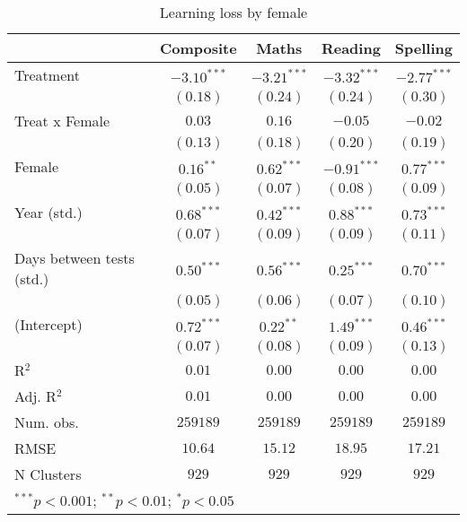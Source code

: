 
\begin{table}
\begin{center}
\begin{tabular}{l c c c c}
\hline
 & Composite & Maths & Reading & Spelling \\
\hline
Treatment                 & $-3.10^{***}$ & $-3.21^{***}$ & $-3.32^{***}$ & $-2.77^{***}$ \\
                          & $(0.18)$      & $(0.24)$      & $(0.24)$      & $(0.30)$      \\
Treat x Female            & $0.03$        & $0.16$        & $-0.05$       & $-0.02$       \\
                          & $(0.13)$      & $(0.18)$      & $(0.20)$      & $(0.19)$      \\
Female                    & $0.16^{**}$   & $0.62^{***}$  & $-0.91^{***}$ & $0.77^{***}$  \\
                          & $(0.05)$      & $(0.07)$      & $(0.08)$      & $(0.09)$      \\
Year (std.)               & $0.68^{***}$  & $0.42^{***}$  & $0.88^{***}$  & $0.73^{***}$  \\
                          & $(0.07)$      & $(0.09)$      & $(0.09)$      & $(0.11)$      \\
Days between tests (std.) & $0.50^{***}$  & $0.56^{***}$  & $0.25^{***}$  & $0.70^{***}$  \\
                          & $(0.05)$      & $(0.06)$      & $(0.07)$      & $(0.10)$      \\
(Intercept)               & $0.72^{***}$  & $0.22^{**}$   & $1.49^{***}$  & $0.46^{***}$  \\
                          & $(0.07)$      & $(0.08)$      & $(0.09)$      & $(0.13)$      \\
\hline
R$^2$                     & $0.01$        & $0.00$        & $0.00$        & $0.00$        \\
Adj. R$^2$                & $0.01$        & $0.00$        & $0.00$        & $0.00$        \\
Num. obs.                 & $259189$      & $259189$      & $259189$      & $259189$      \\
RMSE                      & $10.64$       & $15.12$       & $18.95$       & $17.21$       \\
N Clusters                & $929$         & $929$         & $929$         & $929$         \\
\hline
\multicolumn{5}{l}{\scriptsize{$^{***}p<0.001$; $^{**}p<0.01$; $^{*}p<0.05$}}
\end{tabular}
\caption{Learning loss by female}
\label{tablefemale}
\end{center}
\end{table}
